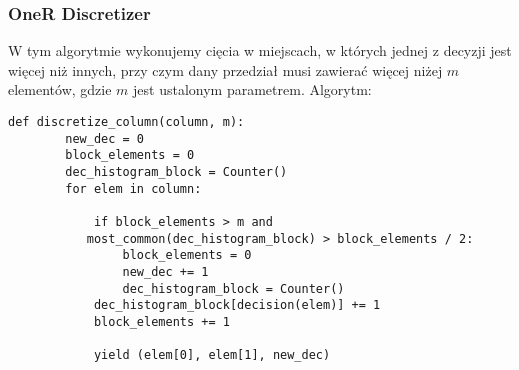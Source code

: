 \documentclass[magisterska]{pracamgr}
\theoremstyle{plain}
\theoremstyle{definition}
\theoremstyle{remark}
\begin{document}
\subsubsection{OneR Discretizer}
W tym algorytmie wykonujemy cięcia w miejscach, w których 
jednej z decyzji jest więcej niż innych, przy czym dany przedział musi zawierać więcej niżej
$m$ elementów, gdzie $m$ jest ustalonym parametrem.
Algorytm:
\begin{lstlisting}[frame=single]
def discretize_column(column, m):
        new_dec = 0
        block_elements = 0
        dec_histogram_block = Counter()
        for elem in column:

            if block_elements > m and
	       most_common(dec_histogram_block) > block_elements / 2:
                block_elements = 0
                new_dec += 1
                dec_histogram_block = Counter()
            dec_histogram_block[decision(elem)] += 1
            block_elements += 1

            yield (elem[0], elem[1], new_dec)
\end{lstlisting}
\end{document}
